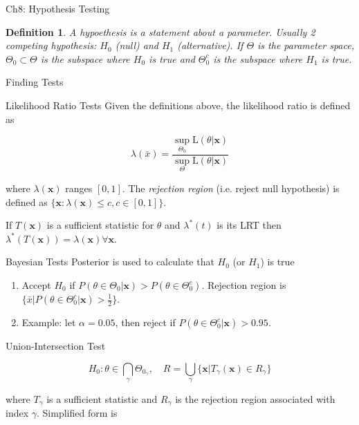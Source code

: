 \documentclass{article}
\newcommand{\Like}{\mathrm{L}}
\newcommand{\bo}[1]{\boldsymbol{#1}}
\newtheorem{definition}{Definition}
\begin{document}
\begin{section}{Ch8: Hypothesis Testing}
\begin{definition}
A hypoethesis is a statement about a parameter. Usually 2 competing hypothesis:
$H_{0}$ (null) and $H_{1}$ (alternative). If $\Theta$ is the parameter
space, $\Theta_{0} \subset \Theta$ is the subspace where $H_{0}$ is true
and $\Theta_{0}^{c}$ is the subspace where $H_{1}$ is true.
\end{definition}

\begin{subsection}{Finding Tests}
\begin{subsubsection}{Likelihood Ratio Tests}
Given the definitions above, the likelihood ratio is defined as

\[ \lambda(\bar{x}) = \frac{\sup_{\Theta_{0}} \Like(\theta|\bo{x})}
                           {\sup_{\Theta} \Like(\theta|\bo{x})} \]

\noindent where $\lambda(\bo{x})$ ranges $[0,1]$. The \emph{rejection region}
(i.e. reject null hypothesis) is defined as 
$\{\bo{x} : \lambda(\bo{x}) \leq c, c \in [0, 1]\}$.

If $T(\bo{x})$ is a sufficient statistic for $\theta$ and $\lambda^{*}(t)$
is its LRT then $\lambda^{*}(T(\bo{x})) = \lambda(\bo{x}) \forall \bo{x}$.
\end{subsubsection}

\begin{subsubsection}{Bayesian Tests}
Posterior is used to calculate that $H_{0}$ (or $H_{1}$) is true

\begin{enumerate}
\item Accept $H_{0}$ if $P(\theta \in \Theta_{0} | \bo{x}) >
  P(\theta \in \Theta_{0}^{c})$. Rejection region is 
  $\{\bar{x} | P(\theta \in \Theta_{0}^{c} | \bo{x}) > \frac{1}{2}\}$.
\item Example: let $\alpha=0.05$, then reject if
  $P(\theta \in \Theta_{0}^{c} | \bo{x}) > 0.95$.
\end{enumerate}
\end{subsubsection}

\begin{subsubsection}{Union-Intersection Test}

\[H_{0} : \theta \in \bigcap_{\gamma} \Theta_{0_{\gamma}} , \quad 
R = \bigcup_{\gamma} \{ \bo{x} | T_{\gamma}(\bo{x}) \in R_{\gamma} \} \]

\noindent where $T_{\gamma}$ is a sufficient statistic and $R_{\gamma}$ is
the rejection region associated with index $\gamma$. Simplified form is


\end{subsubsection}
\end{subsection}
\end{section}
\end{document}
